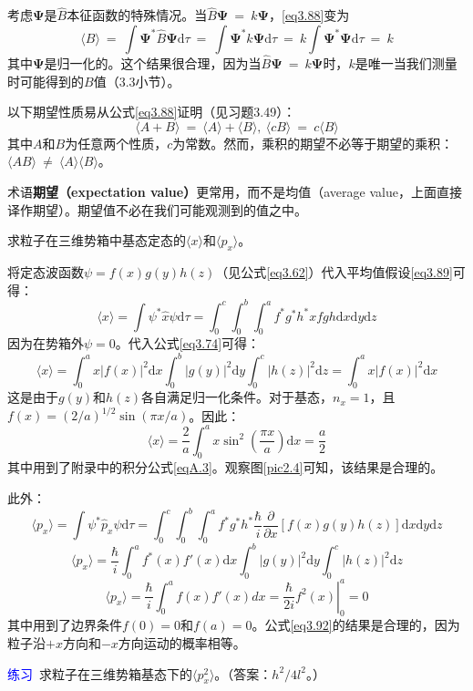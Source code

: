 \documentclass[12pt,a4paper,openany]{ctexbook}
\newcommand{\abs}[1]{\left| #1 \right|}
\newcommand{\ang}[1]{\langle #1 \rangle}
\newcommand{\bp}{\bm{\Psi}}
\newcommand{\dd}[1]{\mathrm{d} #1}
\begin{document}
\begin{flushleft}
考虑$\bp$是$\hat{B}$本征函数的特殊情况。当$\hat{B}\bp\ =\ k\bp$，\eqref{eq3.88}变为
\begin{equation*}
    \ang{B}\ =\ \int \bp^*\hat{B}\bp\dd{\tau}\ =\ \int \bp^*k\bp\dd{\tau}\ =\ k\int\bp^*\bp\dd{\tau}\ =\ k
\end{equation*}
其中$\bp$是归一化的。这个结果很合理，因为当$\hat{B}\bp\ =\ k\bp$时，$k$是唯一当我们测量时可能得到的$B$值（3.3小节）。

以下期望性质易从公式\eqref{eq3.88}证明（见习题3.49）：
\begin{equation}
    \boxed{\ang{A+B}\ =\ \ang{A}+\ang{B}},\ \boxed{\ang{cB}\ =\ c\ang{B}} \label{eq3.90}
\end{equation}
其中$A$和$B$为任意两个性质，$c$为常数。然而，乘积的期望不必等于期望的乘积：$\ang{AB}\ \neq\ \ang{A}\ang{B}$。

术语\textbf{期望（expectation value）}更常用，而不是均值（average value，上面直接译作期望）。期望值不必在我们可能观测到的值之中。

\begin{examplebox}
    \setlength{\parindent}{2em}
求粒子在三维势箱中基态定态的\(\ang{x}\)和\(\ang{p_x}\)。

将定态波函数\(\psi = f(x)g(y)h(z)\)（见公式\eqref{eq3.62}）代入平均值假设\eqref{eq3.89}可得：
\[
\ang{x} = \int \psi^* \hat{x} \psi \dd{\tau} = \int_0^c \int_0^b \int_0^a f^*g^*h^* x fgh \dd{x} \dd{y} \dd{z}
\]
因为在势箱外\(\psi = 0\)。代入公式\eqref{eq3.74}可得：
\[
\ang{x} = \int_0^a x|f(x)|^2 \dd{x} \int_0^b |g(y)|^2 \dd{y} \int_0^c |h(z)|^2 \dd{z} = \int_0^a x|f(x)|^2 \dd{x}
\]
这是由于\(g(y)\)和\(h(z)\)各自满足归一化条件。对于基态，\(n_x = 1\)，且\(f(x) = (2/a)^{1/2} \sin(\pi x / a)\)。因此：
\begin{equation}
\ang{x} = \frac{2}{a} \int_0^a x \sin^2\left(\frac{\pi x}{a}\right) \dd{x} = \frac{a}{2} \label{eq3.91}
\end{equation}
其中用到了附录中的积分公式\eqref{eqA.3}。观察图\ref{pic2.4}可知，该结果是合理的。

此外：
\[
\ang{p_x} = \int \psi^* \hat{p}_x \psi \dd\tau = \int_0^c \int_0^b \int_0^a f^*g^*h^* \frac{\hbar}{i} \frac{\partial}{\partial x} [f(x)g(y)h(z)] \dd{x}\dd{y}\dd{z}
\]
\[
\ang{p_x} = \frac{\hbar}{i} \int_0^a f^*(x)f'(x) \dd{x} \int_0^b \abs{g(y)}^2 \dd{y} \int_0^c \abs{h(z)}^2\dd{z}
\]
\begin{equation}
\ang{p_x} = \frac{\hbar}{i} \int_0^a f(x)f'(x) dx = \left.\frac{\hbar}{2i} f^2(x)\right|_0^a = 0 \label{eq3.92}
\end{equation}
其中用到了边界条件\(f(0) = 0\)和\(f(a) = 0\)。公式\eqref{eq3.92}的结果是合理的，因为粒子沿\(+x\)方向和\(-x\)方向运动的概率相等。

\textcolor{blue}{\large 练习}\ 求粒子在三维势箱基态下的\(\ang{p_x^2}\)。（答案：\(h^2/4l^2\)。）
\end{examplebox}
\end{flushleft}
\end{document}
